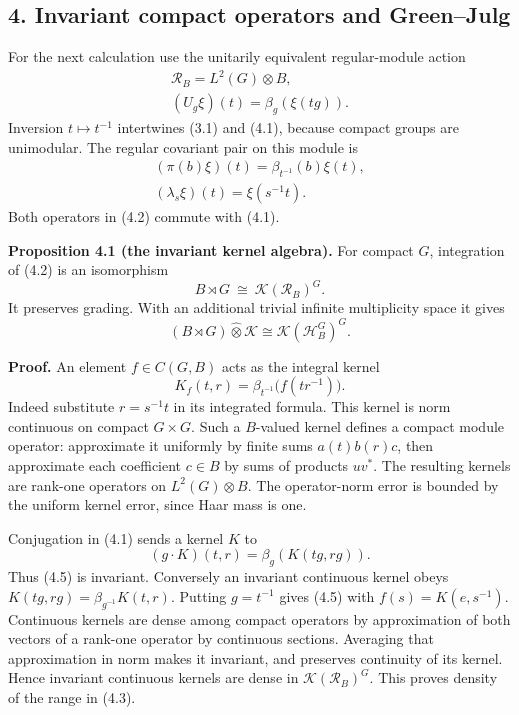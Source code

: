 \documentclass[
  11pt,
]{article}
\begin{document}
\subsection{4. Invariant compact operators and
Green--Julg}\label{invariant-compact-operators-and-greenjulg}

For the next calculation use the unitarily equivalent regular-module
action \[
\begin{gathered}
\mathcal R_B=L^2(G)\otimes B,\\
(U_g\xi)(t)=\beta_g(\xi(tg)).
\end{gathered}
\tag{4.1}
\] Inversion \(t\mapsto t^{-1}\) intertwines (3.1) and (4.1), because
compact groups are unimodular. The regular covariant pair on this module
is \[
\begin{gathered}
(\pi(b)\xi)(t)=\beta_{t^{-1}}(b)\xi(t),\\
(\lambda_s\xi)(t)=\xi(s^{-1}t).
\end{gathered}
\tag{4.2}
\] Both operators in (4.2) commute with (4.1).

\textbf{Proposition 4.1 (the invariant kernel algebra).} For compact
\(G\), integration of (4.2) is an isomorphism \[
B\rtimes G\ \cong\ \mathcal K(\mathcal R_B)^G.
\tag{4.3}
\] It preserves grading. With an additional trivial infinite
multiplicity space it gives \[
(B\rtimes G)\widehat\otimes\mathcal K
 \cong\mathcal K(\mathcal H_B^G)^G.
\tag{4.4}
\]

\textbf{Proof.} An element \(f\in C(G,B)\) acts as the integral kernel
\[
K_f(t,r)=\beta_{t^{-1}}\bigl(f(tr^{-1})\bigr).
\tag{4.5}
\] Indeed substitute \(r=s^{-1}t\) in its integrated formula. This
kernel is norm continuous on compact \(G\times G\). Such a \(B\)-valued
kernel defines a compact module operator: approximate it uniformly by
finite sums \(a(t)b(r)c\), then approximate each coefficient \(c\in B\)
by sums of products \(uv^*\). The resulting kernels are rank-one
operators on \(L^2(G)\otimes B\). The operator-norm error is bounded by
the uniform kernel error, since Haar mass is one.

Conjugation in (4.1) sends a kernel \(K\) to \[
(g\cdot K)(t,r)=\beta_g(K(tg,rg)).
\tag{4.6}
\] Thus (4.5) is invariant. Conversely an invariant continuous kernel
obeys \(K(tg,rg)=\beta_{g^{-1}}K(t,r)\). Putting \(g=t^{-1}\) gives
(4.5) with \(f(s)=K(e,s^{-1})\). Continuous kernels are dense among
compact operators by approximation of both vectors of a rank-one
operator by continuous sections. Averaging that approximation in norm
makes it invariant, and preserves continuity of its kernel. Hence
invariant continuous kernels are dense in
\(\mathcal K(\mathcal R_B)^G\). This proves density of the range in
(4.3).
\end{document}
